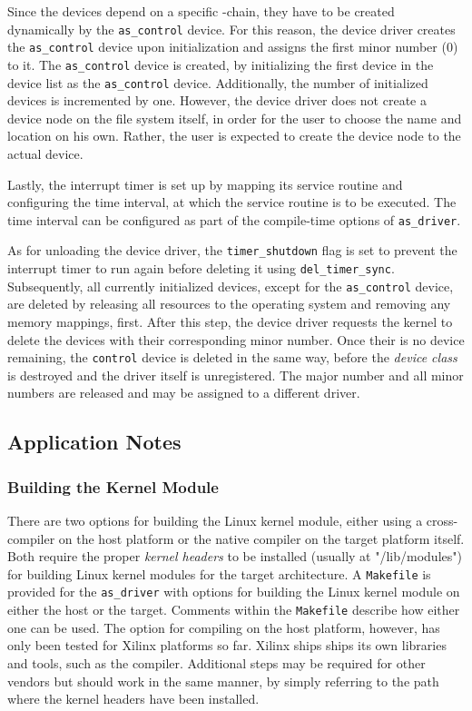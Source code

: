 Since the devices depend on a specific \asterics-chain, they have to be created dynamically by the \texttt{as\_control} device.
For this reason, the device driver creates the \texttt{as\_control} device upon initialization and assigns the first minor number (0) to it.
The \texttt{as\_control} device is created, by initializing the first device in the device list as the \texttt{as\_control} device.
Additionally, the number of initialized devices is incremented by one.
However, the device driver does not create a device node on the file system itself, in order for the user to choose the name and location on his own.
Rather, the user is expected to create the device node to the actual device.

Lastly, the interrupt timer is set up by mapping its service routine and configuring the time interval, at which the service routine is to be executed.
The time interval can be configured as part of the compile-time options of \texttt{as\_driver}.

As for unloading the \asterics device driver, the \texttt{timer\_shutdown} flag is set to prevent the interrupt timer to run again before deleting it using \texttt{del\_timer\_sync}.
Subsequently, all currently initialized devices, except for the \texttt{as\_control} device, are deleted by releasing all resources to the operating system and removing any memory mappings, first.
After this step, the device driver requests the kernel to delete the devices with their corresponding minor number.
Once their is no device remaining, the \texttt{control} device is deleted in the same way, before the \textit{device class} is destroyed and the driver itself is unregistered.
The major number and all minor numbers are released and may be assigned to a different driver.


\subsection{Application Notes}

\subsubsection{Building the Kernel Module}
There are two options for building the Linux kernel module, either using a cross-compiler on the host platform or the native compiler on the target platform itself.
Both require the proper \textit{kernel headers} to be installed (usually at "/lib/modules") for building Linux kernel modules for the target architecture.
A \texttt{Makefile} is provided for the \texttt{as\_driver} with options for building the Linux kernel module on either the host or the target.
Comments within the \texttt{Makefile} describe how either one can be used.
The option for compiling on the host platform, however, has only been tested for Xilinx platforms so far.
Xilinx ships ships its own libraries and tools, such as the compiler.
Additional steps may be required for other vendors but should work in the same manner, by simply referring to the path where the kernel headers have been installed.

